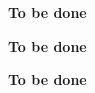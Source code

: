 



% 
% 


\begin{foreword}
{\bf To be done}
\end{foreword}


\begin{preface}
{\bf To be done}
\prefaceauthor{}
\end{preface}



\acknowledgments
{\bf To be done}



